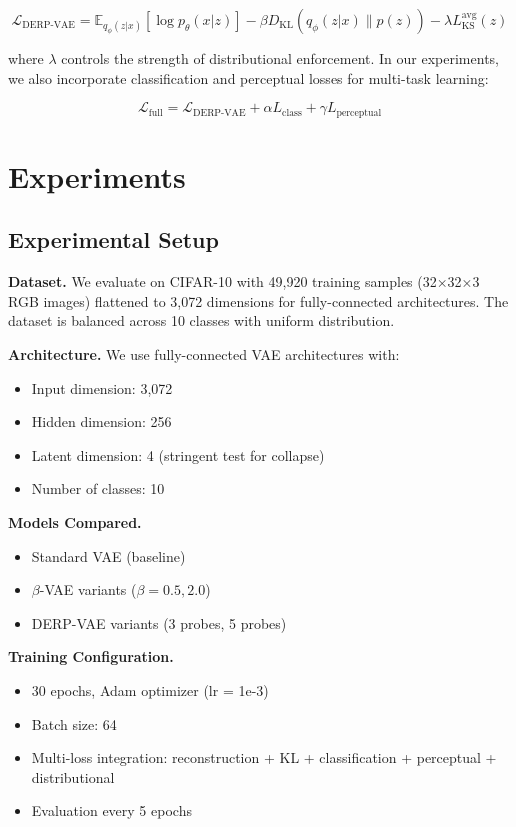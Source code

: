\documentclass{article}
\begin{document}
\begin{equation}
\mathcal{L}_{\text{DERP-VAE}} = \mathbb{E}_{q_{\phi}(z|x)}[\log p_{\theta}(x|z)] - \beta D_{\text{KL}}(q_{\phi}(z|x) \| p(z)) - \lambda L_{\text{KS}}^{\text{avg}}(z)
\end{equation}

where $\lambda$ controls the strength of distributional enforcement. In our experiments, we also incorporate classification and perceptual losses for multi-task learning:

\begin{equation}
\mathcal{L}_{\text{full}} = \mathcal{L}_{\text{DERP-VAE}} + \alpha L_{\text{class}} + \gamma L_{\text{perceptual}}
\end{equation}

\section{Experiments}

\subsection{Experimental Setup}

\textbf{Dataset.} We evaluate on CIFAR-10 with 49,920 training samples (32×32×3 RGB images) flattened to 3,072 dimensions for fully-connected architectures. The dataset is balanced across 10 classes with uniform distribution.

\textbf{Architecture.} We use fully-connected VAE architectures with:
\begin{itemize}
\item Input dimension: 3,072
\item Hidden dimension: 256
\item Latent dimension: 4 (stringent test for collapse)
\item Number of classes: 10
\end{itemize}

\textbf{Models Compared.}
\begin{itemize}
\item Standard VAE (baseline)
\item $\beta$-VAE variants ($\beta = 0.5, 2.0$)
\item DERP-VAE variants (3 probes, 5 probes)
\end{itemize}

\textbf{Training Configuration.}
\begin{itemize}
\item 30 epochs, Adam optimizer (lr = 1e-3)
\item Batch size: 64
\item Multi-loss integration: reconstruction + KL + classification + perceptual + distributional
\item Evaluation every 5 epochs
\end{itemize}
\end{document}
